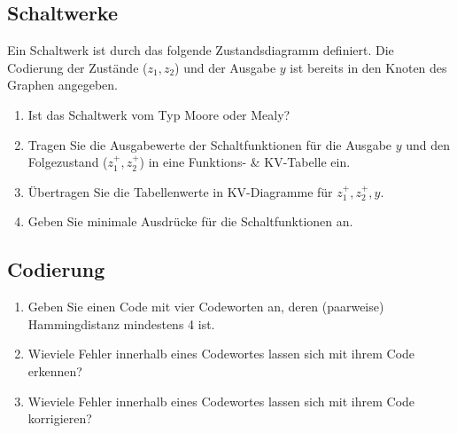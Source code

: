 \documentclass{exercisesheet}
\begin{document}
\subsection{Schaltwerke}
Ein Schaltwerk ist durch das folgende Zustandsdiagramm definiert. Die Codierung der Zustände ($z_1, z_2$) und der Ausgabe $y$ ist bereits in den Knoten des Graphen angegeben.
\begin{center}
\end{center}
\begin{enumerate}
  \item Ist das Schaltwerk vom Typ Moore oder Mealy?
  \item Tragen Sie die Ausgabewerte der Schaltfunktionen für die Ausgabe $y$ und den Folgezustand ($z_1^+, z_2^+$) in eine Funktions- \& KV-Tabelle ein.
  \item Übertragen Sie die Tabellenwerte in KV-Diagramme für $z_1^+, z_2^+, y$.
  \item Geben Sie minimale Ausdrücke für die Schaltfunktionen an.
\end{enumerate}

\subsection{Codierung}
\begin{enumerate}
  \item Geben Sie einen Code mit vier Codeworten an, deren (paarweise) Hammingdistanz mindestens 4 ist.
  \item Wieviele Fehler innerhalb eines Codewortes lassen sich mit ihrem Code erkennen?
  \item Wieviele Fehler innerhalb eines Codewortes lassen sich mit ihrem Code korrigieren?
\end{enumerate}
\end{document}
